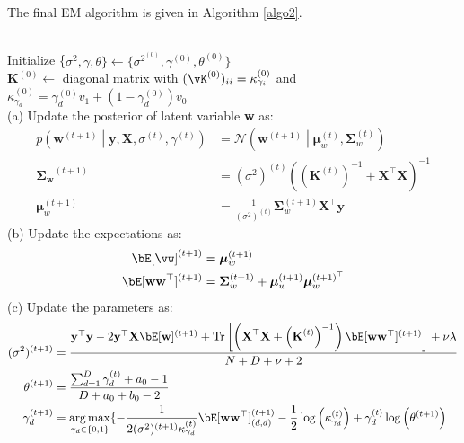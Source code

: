 \documentclass[a4paper,11pt]{article}
\begin{document}
\begin{pmisolution}
\noindent The final EM algorithm is given in Algorithm \ref{algo2}.
\\ \\
\begin{algorithm}[H]
\label{algo2}
\SetAlgoLined
 Initialize \{$\sigma^2, \gamma, \theta\} \leftarrow \{\sigma^{2^{(0)}}, \gamma^{(0)}, \theta^{(0)}\}$\\
 $\textbf{K}^{(0)} \leftarrow$ diagonal matrix with $(\vK^{(0)})_{ii} = \kappa^{(0)}_{\gamma_i}$ and $\kappa^{(0)}_{\gamma_d} = \gamma_d^{(0)} v_1 + (1-\gamma_d^{(0)}) v_0$ \\
  {
 (a) Update the posterior of latent variable \textbf{w} as:
    \begin{align}
        p\left(\textbf{w}^{(t+1)}\middle|\textbf{y}, \textbf{X}, \sigma^{(t)}, \gamma^{(t)}\right) &= \mathcal{N}\left(\textbf{w}^{(t+1)}\middle| \boldsymbol{\mu}_w^{(t)}, \boldsymbol{\Sigma}_w^{(t)}\right)
    \nonumber
    \\ \boldsymbol{\Sigma_w}^{(t+1)} &= (\sigma^{2})^{(t)} \left((\textbf{K}^{(t)})^{-1} + \textbf{X}^\top\textbf{X}\right) ^{-1}
    \nonumber
    \\ \boldsymbol{\mu}_w^{(t+1)} &= \frac{1}{(\sigma^{2})^{(t)}} \boldsymbol{\Sigma}_w^{(t+1)}\textbf{X}^\top\textbf{y}
    \nonumber
    \end{align}
 (b) Update the expectations as:
 \begin{align}
     \bE[\vw]^{(t+1)} &=  \boldsymbol{\mu}_w^{(t+1)}
     \nonumber
     \\ \bE[\textbf{ww}^\top]^{(t+1)} &= \boldsymbol{\Sigma}_w^{(t+1)} + \boldsymbol{\mu}_w^{(t+1)}\boldsymbol{\mu}_w^{{(t+1)}^\top}
     \nonumber
 \end{align}
 (c) Update the parameters as:
 \begin{align}
        (\sigma^2)^{(t+1)} &= \frac{\textbf{y}^\top\textbf{y} - 2\textbf{y}^\top\textbf{X}\bE[\textbf{w}]^{(t+1)}+ \text{Tr}\left[\left(\textbf{X}^\top\textbf{X} +\left(\textbf{K}^{(t)}\right)^{-1}\right)\bE[\textbf{ww}^\top]^{(t+1)}\right]  + \nu\lambda}{N+D+\nu+2}
        \nonumber
        \\\theta^{(t+1)} &= \frac{\sum_{d=1}^D\gamma_d^{(t)} + a_0 -1}{D + a_0 + b_0 -2}
    \nonumber
        \\\gamma_d^{(t+1)}&=\argmax_{\gamma_d \in \{0,1\}} \{-\frac{1}{2(\sigma^2)^{(t+1)}\kappa_{\gamma_d}^{(t)}}\bE[\textbf{ww}^\top]^{(t+1)}_{(d,d)} - \frac{1}{2} \log \left(\kappa_{\gamma_d}^{(t)}\right) + \gamma_d^{(t)} \log \left(\theta^{(t+1)}\right) 

\end{align}}
\end{algorithm}
\end{pmisolution}
\end{document}
